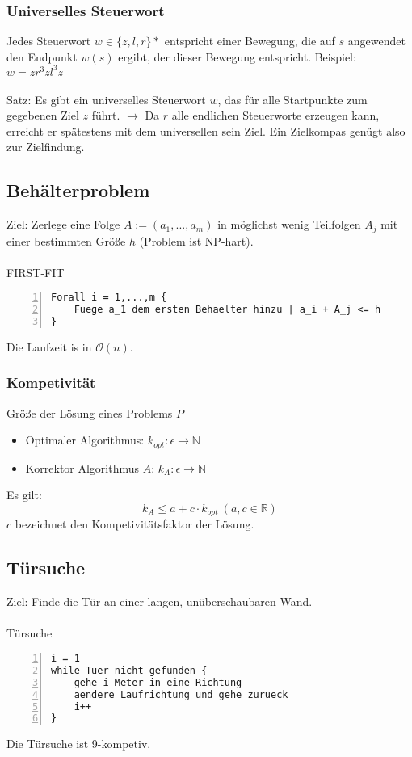 \subsubsection{Universelles Steuerwort}
Jedes Steuerwort \(w \in \{z,l,r\}*\) entspricht einer Bewegung, die auf \(s\) angewendet den Endpunkt \(w(s)\) ergibt, der dieser Bewegung entspricht. Beispiel: \(w = zr^3zl^3z\)
\\\\
Satz: Es gibt ein universelles Steuerwort \(w\), das für alle Startpunkte zum gegebenen Ziel \(z\) führt. \(\rightarrow \) Da \(r\) alle endlichen Steuerworte erzeugen kann, erreicht er spätestens mit dem universellen sein Ziel. Ein Zielkompas genügt also zur Zielfindung.


\subsection{Behälterproblem}
Ziel: Zerlege eine Folge \(A := (a_1,...,a_m)\) in möglichst wenig Teilfolgen \(A_j\) mit einer bestimmten Größe \(h\) (Problem ist NP-hart).
\\\\
FIRST-FIT
\begin{lstlisting}[frame=single,numbers=left]
Forall i = 1,...,m {
	Fuege a_1 dem ersten Behaelter hinzu | a_i + A_j <= h
}
\end{lstlisting}
Die Laufzeit is in \(\mathcal{O}(n)\).

\subsubsection{Kompetivität}
Größe der Lösung eines Problems \(P\)
\begin{itemize}
	\item Optimaler Algorithmus: \(k_{opt}: \epsilon \rightarrow \mathbb{N}\)
	\item Korrektor Algorithmus \(A\): \(k_A: \epsilon \rightarrow \mathbb{N}\)
\end{itemize}
Es gilt:
\[k_A \leq a+c\cdot k_{opt}~(a,c \in \mathbb{R})\]
\(c\) bezeichnet den Kompetivitätsfaktor der Lösung.


\subsection{Türsuche}
Ziel: Finde die Tür an einer langen, unüberschaubaren Wand.
\\\\
Türsuche
\begin{lstlisting}[frame=single,numbers=left]
i = 1
while Tuer nicht gefunden {
	gehe i Meter in eine Richtung
	aendere Laufrichtung und gehe zurueck
	i++
}
\end{lstlisting}
Die Türsuche ist 9-kompetiv.



